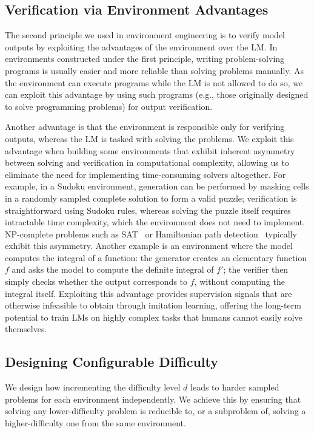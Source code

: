 \documentclass{article}
\theoremstyle{plain}
\theoremstyle{definition}
\theoremstyle{remark}
\begin{document}
\subsection{Verification via Environment Advantages}
The second principle we used in environment engineering is to verify model outputs by exploiting the advantages of the environment over the LM.
In environments constructed under the first principle, writing problem-solving programs is usually easier and more reliable than solving problems manually.
As the environment can execute programs while the LM is not allowed to do so, we can exploit this advantage by using such programs (e.g., those originally designed to solve programming problems) for output verification.

 

Another advantage is that the environment is responsible only for verifying outputs, whereas the LM is tasked with solving the problems.
We exploit this advantage when building some environments that exhibit inherent asymmetry between solving and verification in computational complexity, allowing us to eliminate the need for implementing time-consuming solvers altogether.
For example, in a Sudoku environment, generation can be performed by masking cells in a randomly sampled complete solution to form a valid puzzle;
verification is straightforward using Sudoku rules, whereas solving the puzzle itself requires intractable time complexity, which the environment does not need to implement.
NP-complete problems such as SAT~\citep{cook1971sat} or Hamiltonian path detection~\citep{garey1979npc,karp1972reducibility} typically exhibit this asymmetry.
Another example is an environment where the model computes the integral of a function: the generator creates an elementary function $f$ and asks the model to compute the definite integral of $f'$;
the verifier then simply checks whether the output corresponds to $f$, without computing the integral itself.
Exploiting this advantage provides supervision signals that are otherwise infeasible to obtain through imitation learning, offering the long-term potential to train LMs on highly complex tasks that humans cannot easily solve themselves.




\subsection{Designing Configurable Difficulty}

We design how incrementing the difficulty level $d$ leads to harder sampled problems for each environment independently.
We achieve this by ensuring that solving any lower-difficulty problem is reducible to, or a subproblem of, solving a higher-difficulty one from the same environment.
\end{document}
